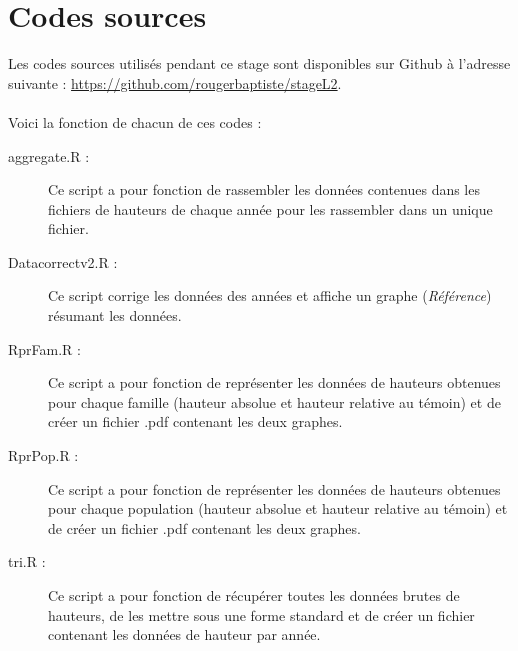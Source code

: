 \documentclass[12pt,a4paper]{article}
\begin{document}
		\section{Codes sources}
		\label{scripts}
		Les codes sources utilisés pendant ce stage sont disponibles sur Github à l'adresse suivante : \url{https://github.com/rougerbaptiste/stageL2}.\\~\\
		Voici la fonction de chacun de ces codes :
		\begin{description}
			\item [aggregate.R :] Ce script a pour fonction de rassembler les données contenues dans les fichiers de hauteurs de chaque année pour les rassembler dans un unique fichier.
			\item [Datacorrectv2.R :] Ce script corrige les données des années et affiche un graphe (\textit{Référence}) résumant les données.
			\item [RprFam.R :] Ce script a pour fonction de représenter les données de hauteurs obtenues pour chaque famille (hauteur absolue et hauteur relative au témoin) et de créer un fichier .pdf contenant les deux graphes.
			\item [RprPop.R :] Ce script a pour fonction de représenter les données de hauteurs obtenues pour chaque population (hauteur absolue et hauteur relative au témoin) et de créer un fichier .pdf contenant les deux graphes.
			\item [tri.R :] Ce script a pour fonction de récupérer toutes les données brutes de hauteurs, de les mettre sous une forme standard et de créer un fichier contenant les données de hauteur par année.
			
		\end{description}
\end{document}
